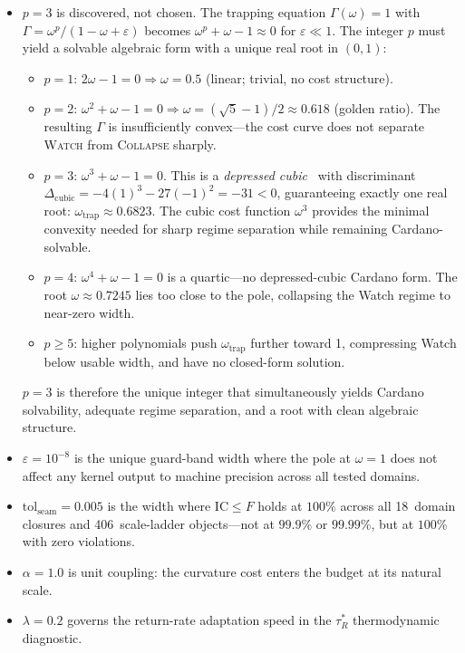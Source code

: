 \documentclass[
  aps,
  prd,
  twocolumn,
  superscriptaddress,
  nofootinbib,
  floatfix
]{revtex4-2}
\newcommand{\tRS}{\tau_{\!R}^{*}}
\newcommand{\Gam}{\Gamma}
\newcommand{\eps}{\varepsilon}
\newcommand{\tolseam}{\mathrm{tol}_{\mathrm{seam}}}
\newcommand{\regime}[1]{\textrm{\upshape\scshape#1}}
\newcommand{\IC}{\mathrm{IC}}
\begin{document}
\begin{itemize}[leftmargin=*]
\item $p = 3$ is discovered, not chosen.  The trapping equation
  $\Gam(\omega) = 1$ with $\Gam = \omega^p/(1 - \omega + \eps)$
  becomes $\omega^p + \omega - 1 \approx 0$ for $\eps \ll 1$.
  The integer $p$ must yield a solvable algebraic form with a
  unique real root in $(0,1)$:
  \begin{itemize}[leftmargin=*]
  \item $p = 1$: $2\omega - 1 = 0 \Rightarrow \omega = 0.5$
    (linear; trivial, no cost structure).
  \item $p = 2$: $\omega^2 + \omega - 1 = 0 \Rightarrow
    \omega = (\sqrt{5}-1)/2 \approx 0.618$ (golden ratio).
    The resulting $\Gam$ is insufficiently convex---the cost
    curve does not separate \regime{Watch} from \regime{Collapse}
    sharply.
  \item $p = 3$: $\omega^3 + \omega - 1 = 0$.  This is a
    \emph{depressed cubic}~\cite{cardano1545} with discriminant
    $\Delta_{\mathrm{cubic}} = -4(1)^3 - 27(-1)^2 = -31 < 0$,
    guaranteeing exactly one real root:
    $\omega_{\mathrm{trap}} \approx 0.6823$.
    The cubic cost function $\omega^3$ provides the minimal
    convexity needed for sharp regime separation while remaining
    Cardano-solvable.
  \item $p = 4$: $\omega^4 + \omega - 1 = 0$ is a quartic---no
    depressed-cubic Cardano form.  The root
    $\omega \approx 0.7245$ lies too close to the pole,
    collapsing the Watch regime to near-zero width.
  \item $p \geq 5$: higher polynomials push $\omega_\mathrm{trap}$
    further toward 1, compressing Watch below usable width,
    and have no closed-form solution.
  \end{itemize}
  $p = 3$ is therefore the unique integer that simultaneously
  yields Cardano solvability, adequate regime separation, and
  a root with clean algebraic structure.

\item $\eps = 10^{-8}$ is the unique guard-band width where the
  pole at $\omega = 1$ does not affect any kernel output to machine
  precision across all tested domains.

\item $\tolseam = 0.005$ is the width where $\IC \leq F$ holds at
  $100\%$ across all 18~domain closures and 406~scale-ladder
  objects---not at $99.9\%$ or $99.99\%$, but at $100\%$ with zero
  violations.

\item $\alpha = 1.0$ is unit coupling: the curvature cost
  enters the budget at its natural scale.

\item $\lambda = 0.2$ governs the return-rate adaptation speed in
  the $\tRS$ thermodynamic diagnostic.
\end{itemize}
\end{document}
